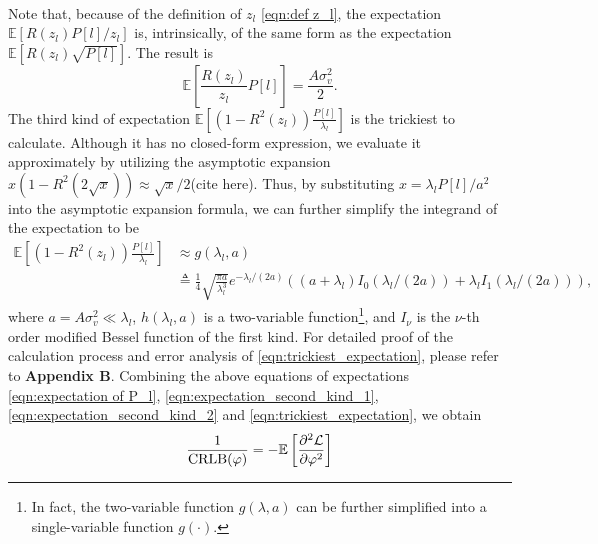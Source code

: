 \documentclass[12pt,draftclsnofoot,journal,onecolumn]{IEEEtran}
\theoremstyle{nonumberplain}
\begin{document}
\begin{IEEEproof}
\begin{equation}
\begin{aligned}
        \end{aligned}
        \label{eqn:expectation_second_kind_1}
    \end{equation}
    Note that, because of the definition of $z_l$ \eqref{eqn:def z_l}, the expectation $\mathbb{E}\left[R(z_l)P[l]/z_l\right]$ is, intrinsically, of the same form as the expectation $\mathbb{E}\left[R(z_l) \sqrt{P[l]}\right]$. The result is
    \begin{equation}
        \mathbb{E}\left[\frac{R(z_l)}{z_l} P[l]\right] = \frac{A\sigma_v^2}{2}.
        \label{eqn:expectation_second_kind_2}
    \end{equation}
    The third kind of expectation $\mathbb{E}\left[(1-R^2(z_l))\frac{P[l]}{\lambda_l}\right]$ is the trickiest to calculate. Although it has no closed-form expression, we evaluate it approximately by utilizing the asymptotic expansion $x(1-R^2(2\sqrt{x})) \approx \sqrt{x}/2$(cite here). Thus, by substituting $x=\lambda_lP[l]/a^2$ into the asymptotic expansion formula, we can further simplify the integrand of the expectation to be 
    \begin{equation}
        \begin{aligned}
            \mathbb{E}\left[(1-R^2(z_l))\frac{P[l]}{\lambda_l}\right] & \approx g(\lambda_l, a) \\ 
            & \triangleq  \frac{1}{4}\sqrt{\frac{\pi a}{\lambda_l^3}}e^{-\lambda_l/(2a)}\left((a+\lambda_l)I_0(\lambda_l/(2a))+\lambda_l I_1(\lambda_l/(2a))\right),
        \end{aligned}
        \label{eqn:trickiest_expectation}
    \end{equation}
    where $a=A\sigma_v^2 \ll \lambda_l$, $h(\lambda_l, a)$ is a two-variable function\footnote{In fact, the two-variable function $g(\lambda, a)$ can be further simplified into a single-variable function $g(\cdot). $}, and $I_\nu$ is the $\nu$-th order  modified Bessel function of the first kind. For detailed proof of the calculation process and error analysis of \eqref{eqn:trickiest_expectation}, please refer to {\bf Appendix B}. Combining the above equations of expectations \eqref{eqn:expectation of P_l}, \eqref{eqn:expectation_second_kind_1}, \eqref{eqn:expectation_second_kind_2} and \eqref{eqn:trickiest_expectation}, we obtain
    \begin{equation}
        \begin{aligned}
        \frac{1}{{\rm CRLB}(\varphi)} & = -\mathbb{E}\left[\frac{\partial^2\mathcal{L}}{\partial\varphi^2}\right] \\

\end{aligned}
\end{equation}
\end{IEEEproof}
\end{document}
